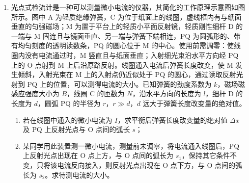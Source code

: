 \documentclass[\gkver]{gaokaozhenti}
\begin{document}
\begin{enumerate}
{$x=v_{0}t$

$y_{1}=\frac{1}{2}gt^{2}=\frac{1}{2}\times10\times0.2^{2}\Um=0.2\Um$

$y_{2}=\frac{1}{2}g(2t)^{2}-\frac{1}{2}gt^{2}=\frac{1}{2}\times10\times(0.4^{2}-0.2^{2})\Um=0.6\Um$

令 $y_{1}=y$，则有

$y_{2}=3y_{1}=3y$

已标注的线段 $s_{1}$、$s_{2}$ 分别为

$s_{1}=\sqrt{x^{2}+y^{2}}$

$s_{2}=\sqrt{x^{2}+(3y)^{2}}=\sqrt{x^{2}+9y^{2}}$

则有

$\sqrt{x^{2}+y^{2}}:\sqrt{x^{2}+9y^{2}}=3:7$

整理得

$x=\frac{2\sqrt 5}{5}y$

故在抛出瞬间小球的速度大小为

$v_{0}=\frac{x}{t}=\frac{2\sqrt 5}{5}\Ums$
}

\item
光点式检流计是一种可以测量微小电流的仪器，其简化的工作原理示意图如图所示。图中 A 为轻质绝缘弹簧，C 为位于纸面上的线圈，虚线框内有与纸面垂直的匀强磁场；M 为置于平台上的轻质小平面反射镜，轻质刚性细杆 D 的一端与 M 固连且与镜面垂直、另一端与弹簧下端相连，PQ 为圆弧形的、带有均匀刻度的透明读数条，PQ 的圆心位于 M 的中心。使用前需调零：使线圈内没有电流通过时，M 竖直且与纸面垂直；入射细光束沿水平方向经 PQ 上的 O 点射到 M 上后沿原路反射。线圈通入电流后弹簧长度改变，使 M 发生倾斜，入射光束在 M 上的入射点仍近似处于 PQ 的圆心，通过读取反射光射到 PQ 上的位置，可以测得电流的大小。已知弹簧的劲度系数为 $k$，磁场磁感应强度大小为 $B$，线圈 C 的匝数为 $N$，沿水平方向的长度为 $l$，细杆 D 的长度为 $d$，圆弧 PQ 的半径为 $r$，$r\gg d$，$d$ 远大于弹簧长度改变量的绝对值。
\begin{enumerate}
	\item
	若在线圈中通入的微小电流为 $I$，求平衡后弹簧长度改变量的绝对值 $\Delta x$ 及 PQ 上反射光点与 O 点间的弧长 $s$；
	\item
	某同学用此装置测一微小电流，测量前未调零，将电流通入线圈后，PQ 上反射光点出现在 O 点上方，与 O 点间的弧长为 $s_{1}$，保持其它条件不变，只将该电流反向接入，则反射光点出现在 O 点下方，与 O 点间的弧长为 $s_{2}$。求待测电流的大小。
\end{enumerate}


\end{enumerate}
\end{document}
